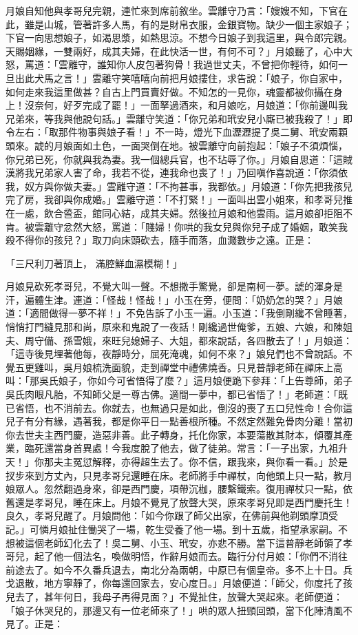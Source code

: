 月娘自知他與孝哥兒完親，連忙來到席前敘坐。雲離守乃言：「嫂嫂不知，下官在此，雖是山城，管著許多人馬，有的是財帛衣服，金銀寶物。缺少一個主家娘子；下官一向思想娘子，如渴思漿，如熱思涼。不想今日娘子到我這里，與令郎完親。天賜姻緣，一雙兩好，成其夫婦，在此快活一世，有何不可？」月娘聽了，心中大怒，罵道：「雲離守，誰知你人皮包著狗骨！我過世丈夫，不曾把你輕待，如何一旦出此犬馬之言！」雲離守笑嘻嘻向前把月娘摟住，求告說：「娘子，你自家中，如何走來我這里做甚？自古上門買賣好做。不知怎的一見你，魂靈都被你攝在身上！沒奈何，好歹完成了罷！」一面拏過酒來，和月娘吃，月娘道：「你前邊叫我兄弟來，等我與他說句話。」雲離守笑道：「你兄弟和玳安兒小廝已被我殺了！」即令左右：「取那件物事與娘子看！」不一時，燈光下血瀝瀝提了吳二舅、玳安兩顆頭來。諕的月娘面如土色，一面哭倒在地。被雲離守向前抱起：「娘子不須煩惱，你兄弟已死，你就與我為妻。我一個總兵官，也不玷辱了你。」月娘自思道：「這賊漢將我兄弟家人害了命，我若不從，連我命也喪了！」乃回嗔作喜說道：「你須依我，奴方與你做夫妻。」雲離守道：「不拘甚事，我都依。」月娘道：「你先把我孩兒完了房，我卻與你成婚。」雲離守道：「不打緊！」一面叫出雲小姐來，和孝哥兒推在一處，飲合巹盃，館同心結，成其夫婦。然後拉月娘和他雲雨。這月娘卻拒阻不肯。被雲離守忿然大怒，罵道：「賤婦！你哄的我女兒與你兒子成了婚姻，敢笑我殺不得你的孩兒？」取刀向床頭砍去，隨手而落，血濺數步之遠。正是：

「三尺利刀著頂上，  滿腔鮮血濕模糊！」

月娘見砍死孝哥兒，不覺大叫一聲。不想撒手驚覺，卻是南柯一夢。諕的渾身是汗，遍體生津。連道：「怪哉！怪哉！」小玉在旁，便問：「奶奶怎的哭？」月娘道：「適間做得一夢不祥！」不免告訴了小玉一遍。小玉道：「我倒剛纔不曾睡著，悄悄打門縫見那和尚，原來和鬼說了一夜話！剛纔過世俺爹，五娘、六娘，和陳姐夫、周守備、孫雪娥，來旺兒媳婦子、大姐，都來說話，各四散去了！」月娘道：「這寺後見埋著他每，夜靜時分，屈死淹魂，如何不來？」娘兒們也不曾說話。不覺五更雞叫，吳月娘梳洗面貌，走到禪堂中禮佛燒香。只見普靜老師在禪床上高叫：「那吳氏娘子，你如今可省悟得了麼？」這月娘便跪下參拜：「上告尊師，弟子吳氏肉眼凡胎，不知師父是一尊古佛。適間一夢中，都已省悟了！」老師道：「既已省悟，也不消前去。你就去，也無過只是如此，倒沒的喪了五口兒性命！合你這兒子有分有緣，遇著我，都是你平日一點善根所種。不然定然難免骨肉分離！當初你去世夫主西門慶，造惡非善。此子轉身，托化你家，本要蕩散其財本，傾覆其產業，臨死還當身首異處！今我度脫了他去，做了徒弟。常言：「一子出家，九祖升天！」你那夫主冤愆解釋，亦得超生去了。你不信，跟我來，與你看一看。」於是扠步來到方丈內，只見孝哥兒還睡在床。老師將手中禪杖，向他頭上只一點，教月娘眾人。忽然翻過身來，卻是西門慶，項帶沉枷，腰繫鐵索。復用禪杖只一點，依舊還是孝哥兒，睡在床上。月娘不覺見了放聲大哭，原來孝哥兒即是西門慶托生！良久，孝哥兒醒了。月娘問他：「如今你跟了師父出家，在佛前與他剃頭摩頂受記。」可憐月娘扯住慟哭了一場，乾生受養了他一場。到十五歲，指望承家嗣。不想被這個老師幻化去了！吳二舅、小玉、玳安，亦悲不勝。當下這普靜老師領了孝哥兒，起了他一個法名，喚做明悟，作辭月娘而去。臨行分付月娘：「你們不消往前途去了。如今不久番兵退去，南北分為兩朝，中原已有個皇帝。多不上十日。兵戈退散，地方寧靜了，你每還回家去，安心度日。」月娘便道：「師父，你度托了孩兒去了，甚年何日，我母子再得見面？」不覺扯住，放聲大哭起來。老師便道：「娘子休哭兒的，那邊又有一位老師來了！」哄的眾人扭頸回頭，當下化陣清風不見了。正是：


